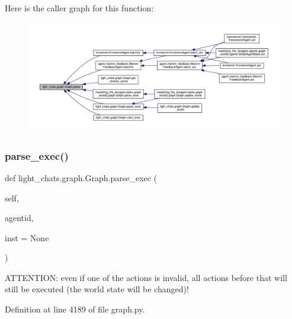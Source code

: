 Here is the caller graph for this function\+:
\nopagebreak
\begin{figure}[H]
\begin{center}
\leavevmode
\includegraphics[width=350pt]{classlight__chats_1_1graph_1_1Graph_a5087252eb40253eacd115e777c092cd8_icgraph}
\end{center}
\end{figure}
\mbox{\label{classlight__chats_1_1graph_1_1Graph_a9aede2dd27f6a9ab66f38eaa5f649195}} 
\subsubsection{\texorpdfstring{parse\+\_\+exec()}{parse\_exec()}}
{\footnotesize\ttfamily def light\+\_\+chats.\+graph.\+Graph.\+parse\+\_\+exec (\begin{DoxyParamCaption}\item[{}]{self,  }\item[{}]{agentid,  }\item[{}]{inst = {\ttfamily None} }\end{DoxyParamCaption})}

\begin{DoxyVerb}ATTENTION: even if one of the actions is invalid, all actions
before that will still be executed (the world state will be changed)!
\end{DoxyVerb}
 

Definition at line 4189 of file graph.\+py.



